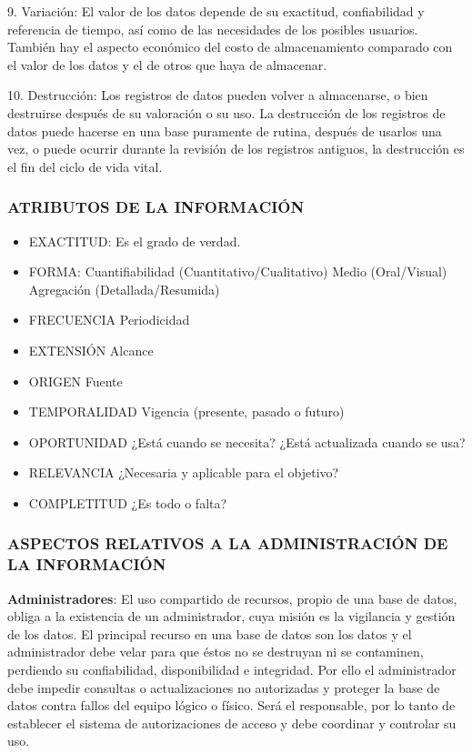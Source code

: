 9. Variación: El valor de los datos depende de su exactitud, confiabilidad y referencia de tiempo, así como de las necesidades de los posibles usuarios. También hay el aspecto económico del costo de almacenamiento comparado con el valor de los datos y el de otros que haya de almacenar.

10. Destrucción: Los registros de datos pueden volver a almacenarse, o bien destruirse después de su valoración o su uso. La destrucción de los registros de datos puede hacerse en una base puramente de rutina, después de usarlos una vez, o puede ocurrir durante la revisión de los registros antiguos, la destrucción es el fin del ciclo de vida vital.

\subsubsection*{ATRIBUTOS DE LA INFORMACIÓN}


\begin{itemize}
  \item EXACTITUD: Es el grado de verdad.
  \item FORMA: Cuantifiabilidad (Cuantitativo/Cualitativo) Medio (Oral/Visual) Agregación (Detallada/Resumida)
  \item FRECUENCIA Periodicidad
  \item EXTENSIÓN Alcance
  \item ORIGEN Fuente
  \item TEMPORALIDAD Vigencia (presente, pasado o futuro)
  \item OPORTUNIDAD ¿Está cuando se necesita? ¿Está actualizada cuando se usa?
  \item RELEVANCIA ¿Necesaria y aplicable para el objetivo?
  \item COMPLETITUD ¿Es todo o falta?
\end{itemize}
\subsubsection*{ASPECTOS RELATIVOS A LA ADMINISTRACIÓN DE LA INFORMACIÓN}
\textbf{Administradores}: El uso compartido de recursos, propio de una base de datos, obliga a la existencia de un administrador, cuya misión es la vigilancia y gestión de los datos. El principal recurso en una base de datos son los datos y el administrador debe velar para que éstos no se destruyan ni se contaminen, perdiendo su confiabilidad, disponibilidad e integridad. Por ello el administrador debe impedir consultas o actualizaciones no autorizadas y proteger la base de datos contra fallos del equipo lógico o físico. Será el responsable, por lo tanto de establecer el sistema de autorizaciones de acceso y debe coordinar y controlar su uso.

